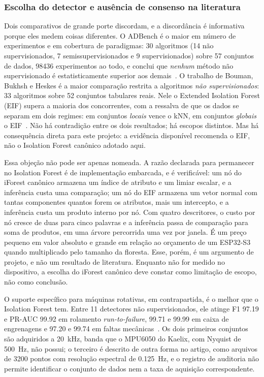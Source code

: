 \documentclass[11pt,a4paper]{article}
\begin{document}
\subsubsection{Escolha do detector e ausência de consenso na literatura}

Dois comparativos de grande porte discordam, e a discordância é informativa porque eles
medem coisas diferentes. O ADBench é o maior em número de experimentos e em cobertura de
paradigmas: \num{30} algoritmos (\num{14} não supervisionados, \num{7}
semissupervisionados e \num{9} supervisionados) sobre \num{57} conjuntos de dados,
\num{98436} experimentos ao todo, e conclui que \emph{nenhum} método não supervisionado é
estatisticamente superior aos demais~\cite{han2022}. O trabalho de Bouman, Bukhsh e Heskes
é a maior comparação restrita a algoritmos \emph{não supervisionados}: \num{33} algoritmos
sobre \num{52} conjuntos tabulares reais. Nele o Extended Isolation Forest (EIF) supera a
maioria dos concorrentes, com a ressalva de que os dados se separam em dois regimes: em
conjuntos \emph{locais} vence o kNN, em conjuntos \emph{globais} o EIF~\cite{bouman2024}.
Não há contradição entre os dois resultados; há escopos distintos. Mas há consequência
direta para este projeto: a evidência disponível recomenda o EIF, não o Isolation Forest
canônico adotado aqui.

Essa objeção não pode ser apenas nomeada. A razão declarada para permanecer no Isolation
Forest é de implementação embarcada, e é verificável: um nó do iForest canônico armazena
um índice de atributo e um limiar escalar, e a inferência custa uma comparação; um nó do
EIF armazena um vetor normal com tantas componentes quantos forem os atributos, mais um
intercepto, e a inferência custa um produto interno por nó. Com quatro descritores, o
custo por nó cresce de duas para cinco palavras e a inferência passa de comparação para
soma de produtos, em uma árvore percorrida uma vez por janela. É um preço pequeno em
valor absoluto e grande em relação ao orçamento de um ESP32-S3 quando multiplicado pelo
tamanho da floresta. Esse, porém, é um argumento de projeto, e não um resultado de
literatura. Enquanto não for medido no dispositivo, a escolha do iForest canônico deve
constar como limitação de escopo, não como conclusão.

O suporte específico para máquinas rotativas, em contrapartida, é o melhor que o Isolation
Forest tem. Entre \num{11} detectores não supervisionados, ele atinge F1 \num{97,19} e
PR-AUC \num{99,92} em rolamento \emph{run-to-failure}, \num{99,71} e \num{99,99} em caixa
de engrenagens e \num{97,20} e \num{99,74} em faltas mecânicas~\cite{brito2022}. Os dois
primeiros conjuntos são adquiridos a \SI{20}{\kilo\hertz}, banda que o MPU6050 do Kaelix,
com Nyquist de \SI{500}{\hertz}, não possui; o terceiro é descrito de outra forma no
artigo, como arquivos de \num{3200} pontos com resolução espectral de \SI{0,125}{\hertz},
e o registro de auditoria não permite identificar o conjunto de dados nem a taxa de
aquisição correspondente.
\end{document}
